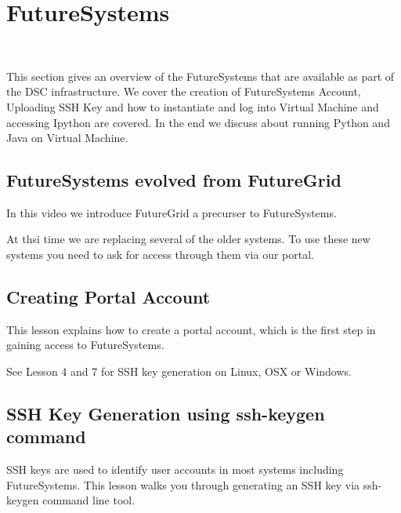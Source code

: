 
\chapter{FutureSystems}
\label{C:futuresystems}

\FILENAME\

This section gives an overview of the FutureSystems that are available
as part of the DSC infrastructure. We cover the creation of
FutureSystems Account, Uploading SSH Key and how to instantiate and
log into Virtual Machine and accessing Ipython are covered. In the end
we discuss about running Python and Java on Virtual Machine.

\section{FutureSystems evolved from FutureGrid}

In this video we introduce FutureGrid a precurser to FutureSystems.


At thsi time we are replacing several of the older systems. To use
these new systems you need to ask for access through them via our portal.


\section{Creating Portal Account}

This lesson explains how to create a portal account, which is the first
step in gaining access to FutureSystems.

See Lesson 4 and 7 for SSH key generation on Linux, OSX or Windows.


\section{SSH Key Generation using ssh-keygen command}
\label{ssh-key-generation-using-ssh-keygen-command}

SSH keys are used to identify user accounts in most systems including
FutureSystems. This lesson walks you through generating an SSH key via
ssh-keygen command line tool.


